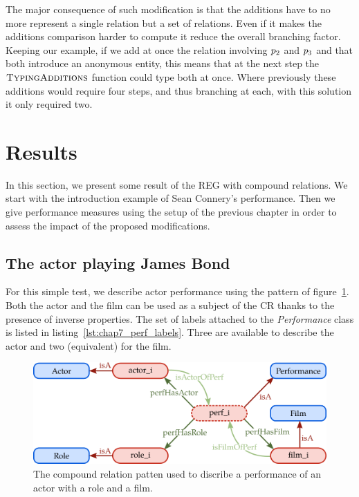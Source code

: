 The major consequence of such modification is that the additions have to no more represent a single relation but a set of relations. Even if it makes the additions comparison harder to compute it reduce the overall branching factor. Keeping our example, if we add at once the relation involving $p_2$ and $p_3$ and that both introduce an anonymous entity, this means that at the next step the $\textsc{TypingAdditions}$ function could type both at once. Where previously these additions would require four steps, and thus branching at each, with this solution it only required two.

\section{Results}

In this section, we present some result of the REG with compound relations. We start with the introduction example of Sean Connery's performance. Then we give performance measures using the setup of the previous chapter in order to assess the impact of the proposed modifications. 

\subsection{The actor playing James Bond}

For this simple test, we describe actor performance using the pattern of figure~\ref{fig:chap7_perf}. Both the actor and the film can be used as a subject of the CR thanks to the presence of inverse properties. The set of labels attached to the \textit{Performance} class is listed in listing~\ref{lst:chap7_perf_labels}. Three are available to describe the actor and two (equivalent) for the film.

\begin{figure}[ht!]
\centering
\includegraphics[scale=0.4]{figures/chapter7/perf.png}
\caption{\label{fig:chap7_perf} The compound relation patten used to discribe a performance of an actor with a role and a film.}
\end{figure}

